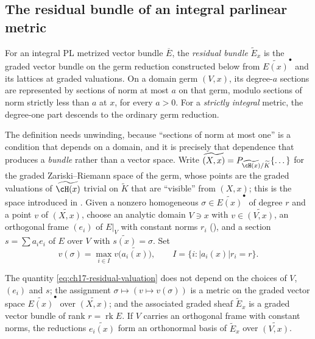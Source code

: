 \subsection{The residual bundle of an integral parlinear metric}
\label{sec:ch17-residual-bundle}

\begin{definition}
\label{def:ch17-residual-bundle}
For an integral PL metrized vector bundle $\overline E$, the
\emph{residual bundle} $\widetilde E_x$ is the graded vector bundle on
the germ reduction constructed below from $\widetilde{E(x)}^{\bullet}$
and its lattices at graded valuations.  On a domain germ $(V,x)$, its
degree-$a$ sections are represented by sections of norm at most $a$
on that germ, modulo sections of norm strictly less than $a$ at $x$,
for every $a>0$.  For a \emph{strictly integral} metric, the degree-one
part descends to the ordinary germ reduction.
\end{definition}

The definition needs unwinding, because ``sections of norm at most one'' is
a condition that depends on a domain, and it is precisely that dependence
that produces a \emph{bundle} rather than a vector space.  Write
$\widetilde{(X,x)}=P_{\widetilde{\cH(x)}/\widetilde K}\{\dots\}$ for the
graded Zariski--Riemann space of the germ, whose points are the graded
valuations of $\widetilde{\cH(x)}$ trivial on $\widetilde K$ that are
``visible'' from $(X,x)$; this is the space introduced in
.  Given a nonzero homogeneous
$\sigma\in\widetilde{E(x)}^{\bullet}$ of degree $r$ and a point $v$ of
$\widetilde{(X,x)}$, choose an analytic domain $V\ni x$ with
$v\in\widetilde{(V,x)}$, an orthogonal frame $(e_i)$ of $E|_V$ with
constant norms $r_i$ (), and a section
$s=\sum a_ie_i$ of $E$ over $V$ with $\widetilde{s(x)}=\sigma$.  Set
\begin{equation}
\label{eq:ch17-residual-valuation}
 v(\sigma)=\max_{i\in I}v\bigl(\widetilde{a_i(x)}\bigr),
 \qquad
 I=\{i:|a_i(x)|r_i=r\}.
\end{equation}

\begin{proposition}
\label{prop:ch17-residual-welldefined}
The quantity \eqref{eq:ch17-residual-valuation} does not depend on the
choices of $V$, $(e_i)$ and $s$; the assignment
$\sigma\mapsto(v\mapsto v(\sigma))$ is a metric on the graded vector space
$\widetilde{E(x)}^{\bullet}$ over $\widetilde{(X,x)}$; and the
associated graded sheaf $\widetilde E_x$ is a graded vector bundle of rank
$r=\operatorname{rk}E$.  If $V$ carries an orthogonal frame with
constant norms, the reductions $\widetilde{e_i(x)}$ form an orthonormal
basis of $\widetilde E_x$ over $\widetilde{(V,x)}$.
\end{proposition}

